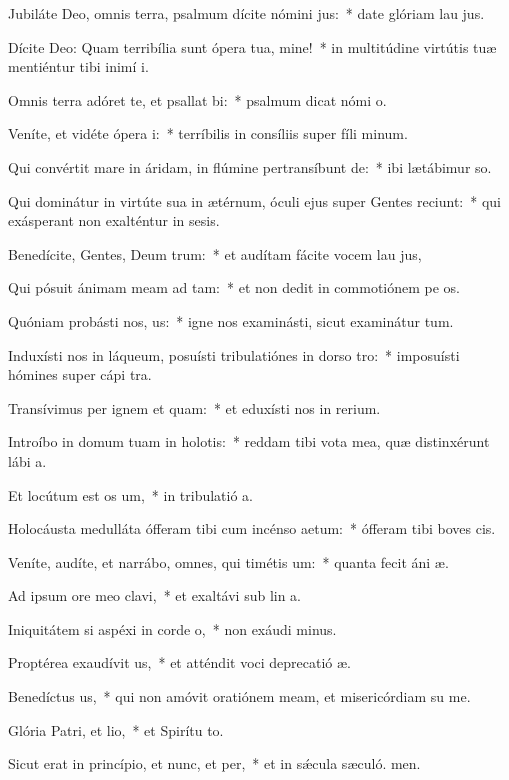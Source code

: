 \item Jubiláte Deo, omnis terra, psalmum dícite nómini jus:~* date glóriam lau jus.
\item Dícite Deo: Quam terribília sunt ópera tua, mine!~* in multitúdine virtútis tuæ mentiéntur tibi inimí i.
\item Omnis terra adóret te, et psallat bi:~* psalmum dicat nómi o.
\item Veníte, et vidéte ópera i:~* terríbilis in consíliis super fíli minum.
\item Qui convértit mare in áridam, in flúmine pertransíbunt de:~* ibi lætábimur  so.
\item Qui dominátur in virtúte sua in ætérnum, óculi ejus super Gentes reciunt:~* qui exásperant non exalténtur in sesis.
\item Benedícite, Gentes, Deum trum:~* et audítam fácite vocem lau jus,
\item Qui pósuit ánimam meam ad tam:~* et non dedit in commotiónem pe os.
\item Quóniam probásti nos, us:~* igne nos examinásti, sicut examinátur tum.
\item Induxísti nos in láqueum, posuísti tribulatiónes in dorso tro:~* imposuísti hómines super cápi tra.
\item Transívimus per ignem et quam:~* et eduxísti nos in rerium.
\item Introíbo in domum tuam in holotis:~* reddam tibi vota mea, quæ distinxérunt lábi a.
\item Et locútum est os um,~* in tribulatió a.
\item Holocáusta medulláta ófferam tibi cum incénso aetum:~* ófferam tibi boves  cis.
\item Veníte, audíte, et narrábo, omnes, qui timétis um:~* quanta fecit áni æ.
\item Ad ipsum ore meo clavi,~* et exaltávi sub lin a.
\item Iniquitátem si aspéxi in corde o,~* non exáudi minus.
\item Proptérea exaudívit us,~* et atténdit voci deprecatió æ.
\item Benedíctus us,~* qui non amóvit oratiónem meam, et misericórdiam su  me.
\item Glória Patri, et lio,~* et Spirítu to.
\item Sicut erat in princípio, et nunc, et per,~* et in sǽcula sæculó. men.

